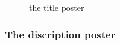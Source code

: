 \begin{figure}[!hbtp]
  \centering
  \caption{the title poster}
  \label{fig:poster_title}
\end{figure}

\pagebreak

\subsubsection{The discription poster}


